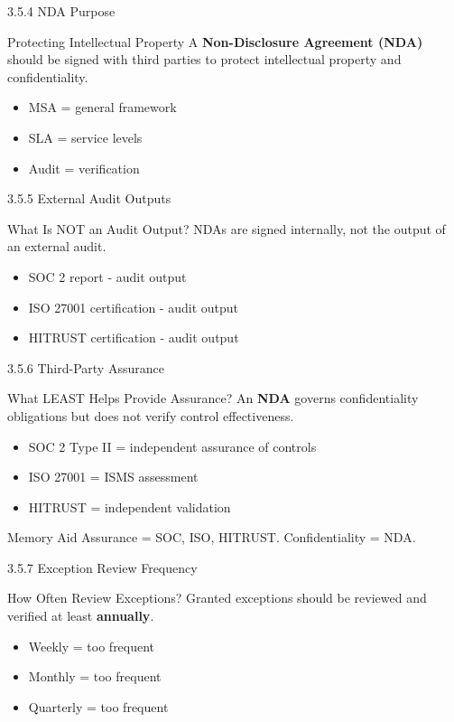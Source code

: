 \documentclass{beamer}
\begin{document}
	\begin{frame}{3.5.4 NDA Purpose}
		\begin{block}{Protecting Intellectual Property}
			A \textbf{Non-Disclosure Agreement (NDA)} should be signed with third parties to protect intellectual property and confidentiality.
		\end{block}
		\begin{itemize}
			\item MSA = general framework
			\item SLA = service levels
			\item Audit = verification
		\end{itemize}
	\end{frame}
	
	\begin{frame}{3.5.5 External Audit Outputs}
		\begin{block}{What Is NOT an Audit Output?}
			NDAs are signed internally, not the output of an external audit.
		\end{block}
		\begin{itemize}
			\item SOC 2 report - audit output
			\item ISO 27001 certification - audit output
			\item HITRUST certification - audit output
		\end{itemize}
	\end{frame}
	
	\begin{frame}{3.5.6 Third-Party Assurance}
		\begin{block}{What LEAST Helps Provide Assurance?}
			An \textbf{NDA} governs confidentiality obligations but does not verify control effectiveness.
		\end{block}
		\begin{itemize}
			\item SOC 2 Type II = independent assurance of controls
			\item ISO 27001 = ISMS assessment
			\item HITRUST = independent validation
		\end{itemize}
		\begin{alertblock}{Memory Aid}
			Assurance = SOC, ISO, HITRUST. Confidentiality = NDA.
		\end{alertblock}
	\end{frame}
	
	\begin{frame}{3.5.7 Exception Review Frequency}
		\begin{block}{How Often Review Exceptions?}
			Granted exceptions should be reviewed and verified at least \textbf{annually}.
		\end{block}
		\begin{itemize}
			\item Weekly = too frequent
			\item Monthly = too frequent
			\item Quarterly = too frequent
		\end{itemize}
	\end{frame}
	
\end{document}
